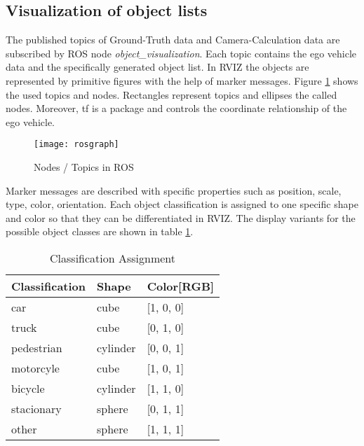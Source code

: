 \subsection{Visualization of object lists}

The published topics of Ground-Truth data and Camera-Calculation data are subscribed by ROS node \textit{object\_visualization}. Each topic contains the ego vehicle data and the specifically generated object list. In RVIZ the objects are represented by primitive figures with the help of marker messages. Figure \ref{fig:Nodes} shows the used topics and nodes. Rectangles represent topics and ellipses the called nodes. Moreover, tf is a package and controls the coordinate relationship of the ego vehicle.

\begin{figure}[thpb]
	\centering
	\texttt{[image: rosgraph]}
	\caption{Nodes / Topics in ROS}
	\label{fig:Nodes}
\end{figure}
Marker messages are described with specific properties such as position, scale, type, color, orientation. Each object classification is assigned to one specific shape and color so that they can be differentiated in RVIZ. The display variants for the possible object classes are shown in table \ref{ClassificationAssignment}. 
\begin{table}[h]
	\caption{Classification Assignment}
	\begin{tabularx}{\columnwidth}{XXX}
		\toprule
		Classification & Shape & Color[RGB]\\
		\toprule
		car & cube & [1, 0, 0]\\
		truck & cube & [0, 1, 0]\\
		pedestrian & cylinder & [0, 0, 1]\\
		motorcyle & cube & [1, 0, 1]\\
		bicycle & cylinder & [1, 1, 0]\\
		stacionary & sphere & [0, 1, 1]\\
		other & sphere & [1, 1, 1]\\
		\bottomrule
	\end{tabularx}
	\label{ClassificationAssignment}
\end{table}

